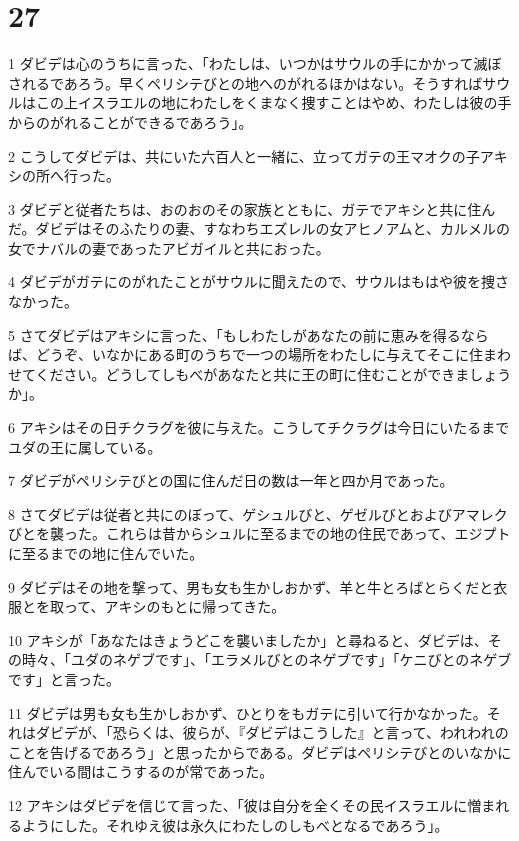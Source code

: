 \chapter{27}

\par 1 ダビデは心のうちに言った、「わたしは、いつかはサウルの手にかかって滅ぼされるであろう。早くペリシテびとの地へのがれるほかはない。そうすればサウルはこの上イスラエルの地にわたしをくまなく捜すことはやめ、わたしは彼の手からのがれることができるであろう」。
\par 2 こうしてダビデは、共にいた六百人と一緒に、立ってガテの王マオクの子アキシの所へ行った。
\par 3 ダビデと従者たちは、おのおのその家族とともに、ガテでアキシと共に住んだ。ダビデはそのふたりの妻、すなわちエズレルの女アヒノアムと、カルメルの女でナバルの妻であったアビガイルと共におった。
\par 4 ダビデがガテにのがれたことがサウルに聞えたので、サウルはもはや彼を捜さなかった。
\par 5 さてダビデはアキシに言った、「もしわたしがあなたの前に恵みを得るならば、どうぞ、いなかにある町のうちで一つの場所をわたしに与えてそこに住まわせてください。どうしてしもべがあなたと共に王の町に住むことができましょうか」。
\par 6 アキシはその日チクラグを彼に与えた。こうしてチクラグは今日にいたるまでユダの王に属している。
\par 7 ダビデがペリシテびとの国に住んだ日の数は一年と四か月であった。
\par 8 さてダビデは従者と共にのぼって、ゲシュルびと、ゲゼルびとおよびアマレクびとを襲った。これらは昔からシュルに至るまでの地の住民であって、エジプトに至るまでの地に住んでいた。
\par 9 ダビデはその地を撃って、男も女も生かしおかず、羊と牛とろばとらくだと衣服とを取って、アキシのもとに帰ってきた。
\par 10 アキシが「あなたはきょうどこを襲いましたか」と尋ねると、ダビデは、その時々、「ユダのネゲブです」、「エラメルびとのネゲブです」「ケニびとのネゲブです」と言った。
\par 11 ダビデは男も女も生かしおかず、ひとりをもガテに引いて行かなかった。それはダビデが、「恐らくは、彼らが、『ダビデはこうした』と言って、われわれのことを告げるであろう」と思ったからである。ダビデはペリシテびとのいなかに住んでいる間はこうするのが常であった。
\par 12 アキシはダビデを信じて言った、「彼は自分を全くその民イスラエルに憎まれるようにした。それゆえ彼は永久にわたしのしもべとなるであろう」。

